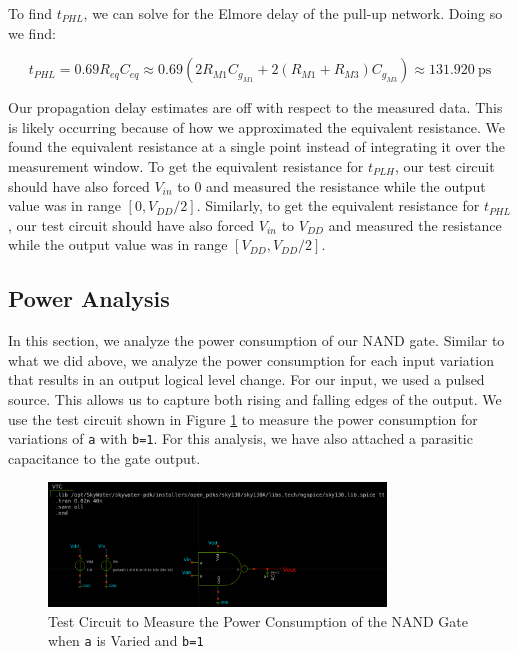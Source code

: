 \documentclass[fleqn]{article}
\begin{document}
	\noindent To find $t_{PHL}$, we can solve for the Elmore delay of the pull-up network. Doing so we find:
	
	\begin{equation}
		t_{PHL} = 0.69R_{eq}C_{eq} \approx 0.69(2R_{M1}C_{g_{M1}} + 2(R_{M1} + R_{M3})C_{g_{M3}})\approx 131.920\ \text{ps}
	\end{equation}
	
	\noindent Our propagation delay estimates are off with respect to the measured data. This is likely occurring because of how we approximated the equivalent resistance. We found the equivalent resistance at a single point instead of integrating it over the measurement window. To get the equivalent resistance for $t_{PLH}$, our test circuit should have also forced $V_{in}$ to $0$ and measured the resistance while the output value was in range $[0, V_{DD}/2]$. Similarly, to get the equivalent resistance for $t_{PHL}$, our test circuit should have also forced $V_{in}$ to $V_{DD}$ and measured the resistance while the output value was in range $[V_{DD}, V_{DD}/2]$.
	
	\subsection{Power Analysis}
	
	In this section, we analyze the power consumption of our NAND gate. Similar to what we did above, we analyze the power consumption for each input variation that results in an output logical level change. For our input, we used a pulsed source. This allows us to capture both rising and falling edges of the output. We use the test circuit shown in Figure \ref{fig::nand_power_test_sweep_va} to measure the power consumption for variations of \texttt{a} with \texttt{b=1}. For this analysis, we have also attached a parasitic capacitance to the gate output.
	
	\begin{figure}[H]
		\centerline{\includegraphics[width=0.8\textwidth]{nand_power_test_sweep_va.png}}
		\caption{Test Circuit to Measure the Power Consumption of the NAND Gate when \texttt{a} is Varied and \texttt{b=1}}
		\label{fig::nand_power_test_sweep_va}
	\end{figure}
	
\end{document}
